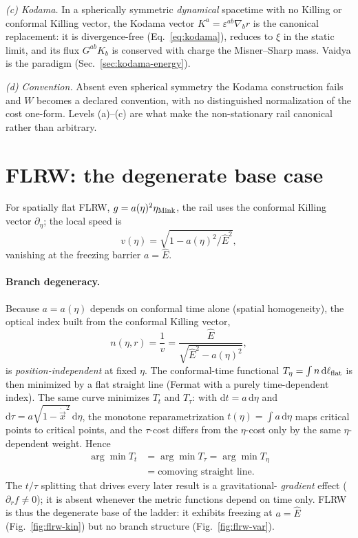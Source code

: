\documentclass[
    aps, prd, twocolumn, superscriptaddress,
    showpacs, nofootinbib, floatfix
]{revtex4-2}
\newcommand{\Ehat}{\hat E}
\newcommand{\dd}{\mathrm{d}}
\begin{document}
\emph{(c) Kodama.} In a spherically symmetric \emph{dynamical} spacetime with no
Killing or conformal Killing vector, the Kodama vector
$K^a=\varepsilon^{ab}\nabla_b r$ \cite{Kodama1980,Hayward1996} is the canonical
replacement: it is divergence-free (Eq.~\eqref{eq:kodama}), reduces to $\xi$ in
the static limit, and its flux $G^{ab}K_b$ is conserved with charge the
Misner--Sharp mass. Vaidya is the paradigm (Sec.~\ref{sec:kodama-energy}).

\emph{(d) Convention.} Absent even spherical symmetry the Kodama construction
fails and $W$ becomes a declared convention, with no distinguished normalization
of the cost one-form. Levels (a)--(c) are what make the non-stationary rail
canonical rather than arbitrary.


\section{FLRW: the degenerate base case}
\label{sec:flrw}
For spatially flat FLRW, $g=a(\eta)^2\eta_{\rm Mink}$, the rail uses the
conformal Killing vector $\partial_\eta$; the local speed is
\begin{equation}
    v(\eta)=\sqrt{1-a(\eta)^2/\Ehat^{2}},
    \label{eq:flrwspeed}
\end{equation}
vanishing at the freezing barrier $a=\Ehat$.
\paragraph{Branch degeneracy.} Because $a=a(\eta)$ depends on conformal time
alone (spatial homogeneity), the optical index built from the conformal Killing
vector,
\begin{equation}
    n(\eta,r)=\frac1v=\frac{\Ehat}{\sqrt{\Ehat^2-a(\eta)^2}},
    \label{eq:flrwindex}
\end{equation}
is \emph{position-independent} at fixed $\eta$. The conformal-time functional
$T_\eta=\int n\,\dd\ell_{\rm flat}$ is then minimized by a flat straight line
(Fermat with a purely time-dependent index). The same curve minimizes $T_t$ and
$T_\tau$: with $\dd t=a\,\dd\eta$ and $\dd\tau=a\sqrt{1-\dot{\vec x}^2}\,\dd\eta$,
the monotone reparametrization $t(\eta)=\int a\,\dd\eta$ maps critical points to
critical points, and the $\tau$-cost differs from the $\eta$-cost only by the
same $\eta$-dependent weight. Hence
\begin{equation}
\begin{split}
    \arg\min T_t&=\arg\min T_\tau=\arg\min T_\eta\\
    &=\text{comoving straight line}.
\end{split}
    \label{eq:flrwdegen}
\end{equation}
The $t/\tau$ splitting that drives every later result is a gravitational-%
\emph{gradient} effect ($\partial_r f\neq0$); it is absent whenever the metric
functions depend on time only. FLRW is thus the degenerate base of the ladder:
it exhibits freezing at $a=\Ehat$ (Fig.~\ref{fig:flrw-kin})
but no branch structure (Fig.~\ref{fig:flrw-var}).
\end{document}
